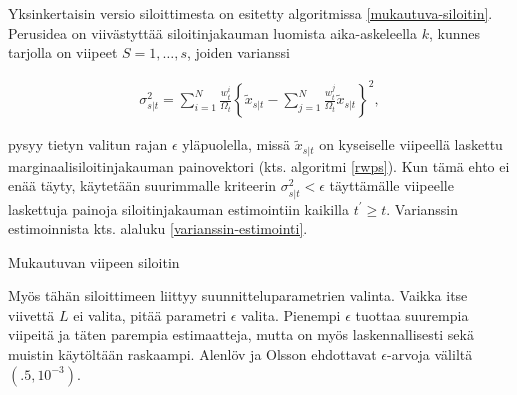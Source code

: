\documentclass[
  12pt,
  a4paper, twoside]{book}
\begin{document}
Yksinkertaisin versio siloittimesta on esitetty algoritmissa \ref{mukautuva-siloitin}. Perusidea on viivästyttää siloitinjakauman luomista aika-askeleella \(k\), kunnes tarjolla on viipeet \(S=1,\ldots,s\), joiden varianssi

\begin{align}\label{siloitin-varianssi}
\sigma^2_{s|t} = \sum_{i=1}^N \frac{w_t^i}{\Omega_t}\left\{\tilde{x}_{s|t} - \sum_{j=1}^N \frac{w_t^j}{\Omega_t}\tilde{x}_{s|t} \right\}^2,
\end{align}

\noindent pysyy tietyn valitun rajan \(\epsilon\) yläpuolella, missä \(\tilde{x}_{s|t}\) on kyseiselle viipeellä laskettu marginaalisiloitinjakauman painovektori (kts. algoritmi \ref{rwps}). Kun tämä ehto ei enää täyty, käytetään suurimmalle kriteerin \(\sigma^2_{s|t} < \epsilon\) täyttämälle viipeelle laskettuja painoja siloitinjakauman estimointiin kaikilla \(t^\prime \ge t\). Varianssin estimoinnista kts. alaluku \ref{varianssin-estimointi}.

\begin{algorithm}[H]
\label{mukautuva-siloitin}
\DontPrintSemicolon
\SetAlgoShortEnd
{}
\caption{Mukautuvan viipeen siloitin}
\end{algorithm}

Myös tähän siloittimeen liittyy suunnitteluparametrien valinta. Vaikka itse viivettä \(L\) ei valita, pitää parametri \(\epsilon\) valita. Pienempi \(\epsilon\) tuottaa suurempia viipeitä ja täten parempia estimaatteja, mutta on myös laskennallisesti sekä muistin käytöltään raskaampi. Alenlöv ja Olsson ehdottavat \(\epsilon\)-arvoja väliltä \((.5, 10^{-3})\).
\end{document}
